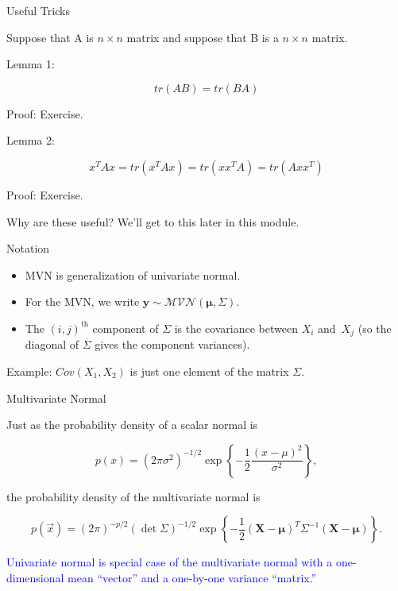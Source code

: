 \documentclass[ignorenonframetext,]{beamer}
\newcommand{\bmu}{\bm{\mu}}
\newcommand{\bx}{\ensuremath{\mathbf{X}}}
\begin{document}
\begin{frame}{Useful Tricks}

Suppose that A is \(n \times n\) matrix and suppose that B is a
\(n \times n\) matrix.

Lemma 1:

\[tr(AB) = tr(BA)\]

Proof: Exercise.

Lemma 2:

\[x^TAx = tr(x^TAx) = tr(xx^TA) = tr(Axx^T)\]

Proof: Exercise.

Why are these useful? We'll get to this later in this module.

\end{frame}

\begin{frame}{Notation}

\begin{itemize}
\item MVN is generalization of univariate normal.
\item For the MVN, we write $\bm{y} \sim
\mathcal{MVN}(\bmu,\Sigma)$. 
\item The $(i,j)^{\text{th}}$
component of $\Sigma$ is the covariance between $X_i$ and~$X_j$ (so
the diagonal of $\Sigma$ gives the component variances).
\end{itemize}

Example: \(Cov(X_1, X_2)\) is just one element of the matrix \(\Sigma.\)

\end{frame}

\begin{frame}{Multivariate Normal}

Just as the probability density of a scalar normal is

\begin{equation}
p(x) = {\left(2\pi\sigma^2\right)}^{-1/2}\exp{\left\{ -\frac{1}{2} \frac{(x-\mu)^2}{\sigma^2}\right\}},
\end{equation}

the probability density of the multivariate normal is

\begin{equation}
p(\vec{x}) = {\left(2\pi\right)}^{-p/2}(\det{\Sigma})^{-1/2} \exp{\left\{-\frac{1}{2} (\bx-\bmu)^T\Sigma^{-1} (\bx - \bmu)\right\}}.
\end{equation}

\textcolor{blue}{Univariate normal is special case of the multivariate normal with a one-dimensional mean ``vector'' and a one-by-one variance ``matrix.''}

\end{frame}
\end{document}
